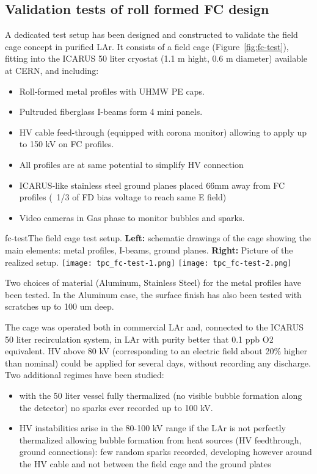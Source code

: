\subsection{Validation tests of roll formed FC design}

A dedicated test setup has been designed and constructed to validate the field cage concept  in purified LAr.
It consists of a field cage (Figure~\ref{fig:fc-test}), fitting into the ICARUS 50 liter cryostat (1.1 m hight, 0.6 m diameter) available at CERN, and  including:

\begin{itemize}	
\item Roll-formed metal profiles with UHMW PE caps.
\item Pultruded fiberglass I-beams form 4 mini panels.
\item HV cable feed-through (equipped with corona monitor) allowing to apply up to 150 kV on FC profiles.
\item All profiles are at same potential to simplify HV connection
\item ICARUS-like stainless steel ground planes placed  66mm away from FC profiles (~1/3 of FD bias voltage to reach
same E field)
\item Video cameras in Gas phase to monitor bubbles and sparks.
\end{itemize}

\begin{cdrfigure}{fc-test}{The field cage test setup. 
 {\bf Left:} schematic drawings of the cage showing the main elements: metal profiles, I-beams, ground planes.
  {\bf Right:} Picture of the realized setup.}
\texttt{[image: tpc\_fc-test-1.png]}
\texttt{[image: tpc\_fc-test-2.png]}
\end{cdrfigure}

Two choices of material (Aluminum, Stainless Steel) for the metal profiles have been tested. In the Aluminum case, the surface finish has also been tested with scratches up to 100 um deep. 

The cage was operated both in commercial LAr and, connected to the ICARUS 50 liter recirculation system, in LAr  with purity  better that 0.1 ppb O2 equivalent. HV above 80 kV (corresponding to an electric field about 20\% higher than nominal) could be applied for several days, without recording any discharge. Two additional regimes have been studied:
\begin{itemize}	
\item  with the 50 liter vessel fully thermalized (no visible bubble formation along the detector) no sparks ever recorded up to 100 kV.
\item  HV instabilities arise in the 80-100 kV range if the LAr is not perfectly thermalized allowing bubble formation from heat sources (HV feedthrough, ground connections): few random sparks recorded, developing however around the HV cable and not between the field cage and the ground plates
\end{itemize}

